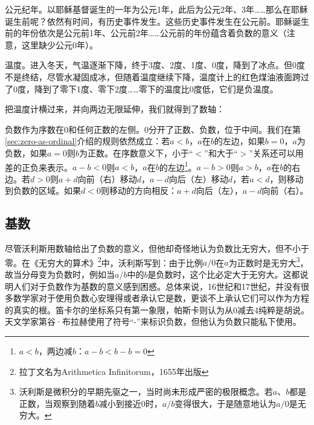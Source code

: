 \documentclass[b5paper]{ctexart}
\begin{document}
\begin{example}
公元纪年。以耶稣基督诞生的一年为公元1年，此后为公元2年、3年……那么在耶稣诞生前呢？依然有时间，有历史事件发生。这些历史事件发生在公元前。耶稣诞生前的年份依次是公元前1年、公元前2年……公元前的年份蕴含着负数的意义（注意，这里缺少公元0年）。
\end{example}

\begin{example}
温度。进入冬天，气温逐渐下降，终于3度、2度、1度、0度，降到了冰点。但0度不是终结，尽管水凝固成冰，但随着温度继续下降，温度计上的红色煤油液面跨过了0度，降到了零下1度、零下2度……零下的温度比0度低，它们是负温度。
\end{example}

把温度计横过来，并向两边无限延伸，我们就得到了数轴：

\begin{center}
\end{center}

负数作为序数在0和任何正数的左侧。0分开了正数、负数，位于中间。我们在第\ref{sec:zero-as-ordinal}介绍的规则依然成立：若$a < b$，$a$在$b$的左边，如果$b = 0$，$a$为负数，如果$a = 0$则$b$为正数。在序数意义下，小于“$<$”和大于“$>$”关系还可以用差的正负来表示。$a - b < 0$则$a < b$，$a$在$b$的左边\footnote{$a < b$，两边减$b$：$a - b < b - b = 0$}。$a - b > 0$则$a > b$，$a$在$b$的右边。若$d > 0$则$a + d$向前（右）移动$d$，$a - d$向后（左）移动$d$，若$a < d$，则移动到负数的区域。如果$d < 0$则移动的方向相反：$a + d$向后（左），$a - d$向前（右）。

\subsection{基数}
尽管沃利斯用数轴给出了负数的意义，但他却奇怪地认为负数比无穷大，但不小于零。在《无穷大的算术》\footnote{拉丁文名为Arithmetica Infinitorum，1655年出版}中，沃利斯写到：由于比例$a/0$在$a$为正数时是无穷大\footnote{沃利斯是微积分的早期先驱之一，当时尚未形成严密的极限概念。若$a$、$b$都是正数，当观察到随着$b$减小到接近0时，$a/b$变得很大，于是随意地认为$a/0$是无穷大。}，故当分母变为负数时，例如当$a/b$中的$b$是负数时，这个比必定大于无穷大\cite{MKlein-1972}。这都说明人们对于负数作为基数的意义感到困惑。总体来说，16世纪和17世纪，并没有很多数学家对于使用负数心安理得或者承认它是数，更谈不上承认它们可以作为方程的真实的根\cite{MKlein-1972}。笛卡尔的坐标系只有第一象限，帕斯卡则认为从0减去4纯粹是胡说。天文学家第谷·布拉赫使用了符号“-”来标识负数，但他认为负数只能私下使用。
\end{document}
